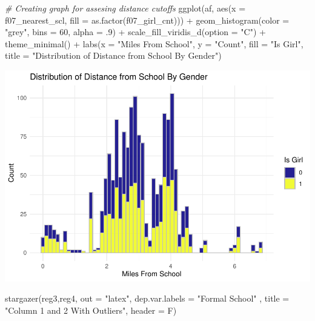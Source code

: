 \documentclass[
]{article}
\newenvironment{Shaded}{\begin{snugshade}}{\end{snugshade}}
\newcommand{\AttributeTok}[1]{\textcolor[rgb]{0.77,0.63,0.00}{#1}}
\newcommand{\CommentTok}[1]{\textcolor[rgb]{0.56,0.35,0.01}{\textit{#1}}}
\newcommand{\DecValTok}[1]{\textcolor[rgb]{0.00,0.00,0.81}{#1}}
\newcommand{\FunctionTok}[1]{\textcolor[rgb]{0.00,0.00,0.00}{#1}}
\newcommand{\NormalTok}[1]{#1}
\newcommand{\SpecialCharTok}[1]{\textcolor[rgb]{0.00,0.00,0.00}{#1}}
\newcommand{\StringTok}[1]{\textcolor[rgb]{0.31,0.60,0.02}{#1}}
\begin{document}
\begin{Shaded}
\begin{Highlighting}[]
\CommentTok{\# Creating graph for assesing distance cutoffs}
\FunctionTok{ggplot}\NormalTok{(af, }\FunctionTok{aes}\NormalTok{(}\AttributeTok{x =}\NormalTok{ f07\_nearest\_scl, }\AttributeTok{fill =} \FunctionTok{as.factor}\NormalTok{(f07\_girl\_cnt))) }\SpecialCharTok{+}
  \FunctionTok{geom\_histogram}\NormalTok{(}\AttributeTok{color =} \StringTok{"grey"}\NormalTok{, }\AttributeTok{bins =} \DecValTok{60}\NormalTok{, }\AttributeTok{alpha =}\NormalTok{ .}\DecValTok{9}\NormalTok{) }\SpecialCharTok{+}
  \FunctionTok{scale\_fill\_viridis\_d}\NormalTok{(}\AttributeTok{option =} \StringTok{"C"}\NormalTok{) }\SpecialCharTok{+}
  \FunctionTok{theme\_minimal}\NormalTok{() }\SpecialCharTok{+}
  \FunctionTok{labs}\NormalTok{(}\AttributeTok{x =} \StringTok{"Miles From School"}\NormalTok{, }\AttributeTok{y =} \StringTok{"Count"}\NormalTok{, }\AttributeTok{fill =} \StringTok{"Is Girl"}\NormalTok{,}
       \AttributeTok{title =} \StringTok{"Distribution of Distance from School By Gender"}\NormalTok{)}
\end{Highlighting}
\end{Shaded}

\includegraphics{HW1_files/figure-latex/histrogram-1.pdf}

\begin{Shaded}
\begin{Highlighting}[]
\FunctionTok{stargazer}\NormalTok{(reg3,reg4, }\AttributeTok{out =} \StringTok{"latex"}\NormalTok{, }\AttributeTok{dep.var.labels =} \StringTok{"Formal School"}
\NormalTok{          , }\AttributeTok{title =} \StringTok{"Column 1 and 2 With Outliers"}\NormalTok{, }\AttributeTok{header =}\NormalTok{ F)}
\end{Highlighting}
\end{Shaded}
\end{document}
